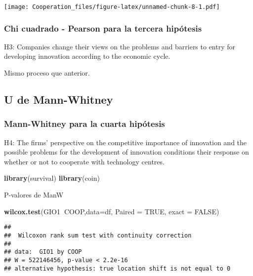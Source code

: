 \documentclass[
]{article}
\newenvironment{Shaded}{\begin{snugshade}}{\end{snugshade}}
\newcommand{\DataTypeTok}[1]{\textcolor[rgb]{0.13,0.29,0.53}{#1}}
\newcommand{\KeywordTok}[1]{\textcolor[rgb]{0.13,0.29,0.53}{\textbf{#1}}}
\newcommand{\NormalTok}[1]{#1}
\newcommand{\OperatorTok}[1]{\textcolor[rgb]{0.81,0.36,0.00}{\textbf{#1}}}
\newcommand{\OtherTok}[1]{\textcolor[rgb]{0.56,0.35,0.01}{#1}}
\begin{document}
\texttt{[image: Cooperation\_files/figure-latex/unnamed-chunk-8-1.pdf]}

\hypertarget{chi-cuadrado---pearson-para-la-tercera-hipuxf3tesis}{%
\subsubsection{Chi cuadrado - Pearson para la tercera
hipótesis}\label{chi-cuadrado---pearson-para-la-tercera-hipuxf3tesis}}

H3: Companies change their views on the problems and barriers to entry
for developing innovation according to the economic cycle.

Mismo proceso que anterior.

\hypertarget{u-de-mann-whitney}{%
\subsection{U de Mann-Whitney}\label{u-de-mann-whitney}}

\hypertarget{mann-whitney-para-la-cuarta-hipuxf3tesis}{%
\subsubsection{Mann-Whitney para la cuarta
hipótesis}\label{mann-whitney-para-la-cuarta-hipuxf3tesis}}

H4: The firms' perspective on the competitive importance of innovation
and the possible problems for the development of innovation conditions
their response on whether or not to cooperate with technology centres.

\begin{Shaded}
\begin{Highlighting}[]
\KeywordTok{library}\NormalTok{(survival)}
\KeywordTok{library}\NormalTok{(coin)}
\end{Highlighting}
\end{Shaded}

P-valores de ManW

\begin{Shaded}
\begin{Highlighting}[]
\KeywordTok{wilcox.test}\NormalTok{(GIO1}\OperatorTok{~}\NormalTok{COOP,}\DataTypeTok{data=}\NormalTok{df, }\DataTypeTok{Paired =} \OtherTok{TRUE}\NormalTok{, }\DataTypeTok{exact =} \OtherTok{FALSE}\NormalTok{)}
\end{Highlighting}
\end{Shaded}

\begin{verbatim}
## 
##  Wilcoxon rank sum test with continuity correction
## 
## data:  GIO1 by COOP
## W = 522146456, p-value < 2.2e-16
## alternative hypothesis: true location shift is not equal to 0
\end{verbatim}
\end{document}
